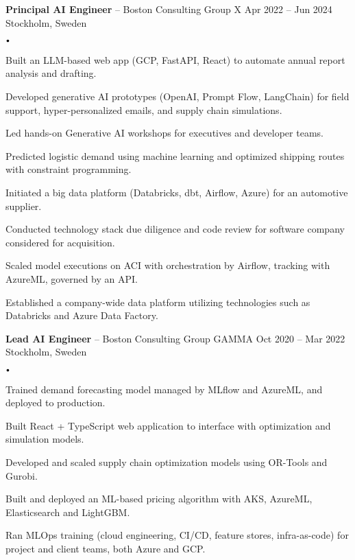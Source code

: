 \documentclass{article}
\newcommand{\experience}[5]{
    \vspace*{2pt}
    \textbf{#1} -- #2 \hfill #3 \\ 
    #4 \\
    #5
    \vspace*{2pt}
}
\newcommand{\spacedbullet}{
    $\vcenter{\hbox{\tiny$\bullet$}}$\hspace*{-2pt}
}
\newenvironment{bulletlist}{
    \begin{list}
        {\spacedbullet}{\setlength\leftmargin{10pt} 
        \topsep 0pt \itemsep -2pt}}{\vspace*{4pt}
    \end{list}
}
\begin{document}
\experience{Principal AI Engineer}{Boston Consulting Group X}{Apr 2022 -- Jun 2024}{Stockholm, Sweden}
{
    \begin{bulletlist}
        \item Built an LLM-based web app (GCP, FastAPI, React) to automate annual report analysis and drafting.
        \item Developed generative AI prototypes (OpenAI, Prompt Flow, LangChain) for field support, hyper-personalized emails, and supply chain simulations.
        \item Led hands-on Generative AI workshops for executives and developer teams.
        \item Predicted logistic demand using machine learning and optimized shipping routes with constraint programming.
        \item Initiated a big data platform (Databricks, dbt, Airflow, Azure) for an automotive supplier.
        \item Conducted technology stack due diligence and code review for software company considered for acquisition.
        \item Scaled model executions on ACI with orchestration by Airflow, tracking with AzureML, governed by an API.
        \item Established a company-wide data platform utilizing technologies such as Databricks and Azure Data Factory.
    \end{bulletlist}
}

\experience{Lead AI Engineer}{Boston Consulting Group GAMMA}{Oct 2020 -- Mar 2022}{Stockholm, Sweden}
{
    \begin{bulletlist}
        \item Trained demand forecasting model managed by MLflow and AzureML, and deployed to production.
        \item Built React + TypeScript web application to interface with optimization and simulation models.
        \item Developed and scaled supply chain optimization models using OR-Tools and Gurobi.
        \item Built and deployed an ML-based pricing algorithm with AKS, AzureML, Elasticsearch and LightGBM.
        \item Ran MLOps training (cloud engineering, CI/CD, feature stores, infra-as-code) for project and client teams, both Azure and GCP.
    \end{bulletlist}
}
\end{document}
